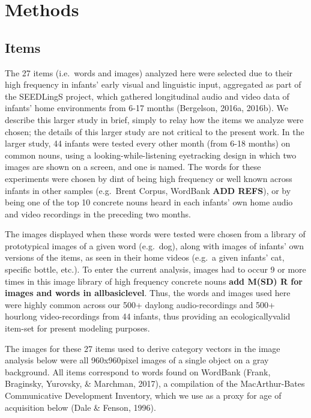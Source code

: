 \documentclass[10pt, letterpaper]{article}
\begin{document}
\section{Methods}\label{methods}

\subsection{Items}\label{items}

The 27 items (i.e.~words and images) analyzed here were selected due to
their high frequency in infants' early visual and linguistic input,
aggregated as part of the SEEDLingS project, which gathered longitudinal
audio and video data of infants' home environments from 6-17 months
(Bergelson, 2016a, 2016b). We describe this larger study in brief,
simply to relay how the items we analyze were chosen; the details of
this larger study are not critical to the present work. In the larger
study, 44 infants were tested every other month (from 6-18 months) on
common nouns, using a looking-while-listening eyetracking design in
which two images are shown on a screen, and one is named. The words for
these experiments were chosen by dint of being high frequency or well
known across infants in other samples (e.g.~Brent Corpus, WordBank
\textbf{ADD REFS}), or by being one of the top 10 concrete nouns heard
in each infants' own home audio and video recordings in the preceding
two months.

The images displayed when these words were tested were chosen from a
library of prototypical images of a given word (e.g.~dog), along with
images of infants' own versions of the items, as seen in their home
videos (e.g.~a given infants' cat, specific bottle, etc.). To enter the
current analysis, images had to occur 9 or more times in this image
library of high frequency concrete nouns \textbf{add M(SD) R for images
and words in allbasiclevel}. Thus, the words and images used here were
highly common across our 500+ daylong audio-recordings and 500+ hourlong
video-recordings from 44 infants, thus providing an ecologicallyvalid
item-set for present modeling purposes.

The images for these 27 items used to derive category vectors in the
image analysis below were all 960x960pixel images of a single object on
a gray background. All items correspond to words found on WordBank
(Frank, Braginsky, Yurovsky, \& Marchman, 2017), a compilation of the
MacArthur-Bates Communicative Development Inventory, which we use as a
proxy for age of acquisition below (Dale \& Fenson, 1996).
\end{document}
